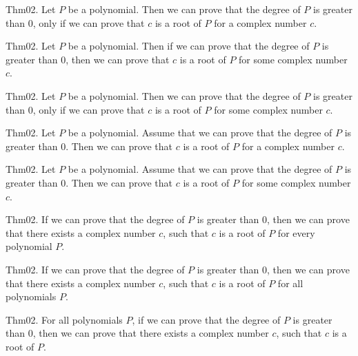 \documentclass{article}
\begin{document}
Thm02. Let $P$ be a polynomial. Then we can prove that the degree of $P$ is greater than $0$, only if we can prove that $c$ is a root of $P$ for a complex number $c$.

Thm02. Let $P$ be a polynomial. Then if we can prove that the degree of $P$ is greater than $0$, then we can prove that $c$ is a root of $P$ for some complex number $c$.

Thm02. Let $P$ be a polynomial. Then we can prove that the degree of $P$ is greater than $0$, only if we can prove that $c$ is a root of $P$ for some complex number $c$.

Thm02. Let $P$ be a polynomial. Assume that we can prove that the degree of $P$ is greater than $0$. Then we can prove that $c$ is a root of $P$ for a complex number $c$.

Thm02. Let $P$ be a polynomial. Assume that we can prove that the degree of $P$ is greater than $0$. Then we can prove that $c$ is a root of $P$ for some complex number $c$.

Thm02. If we can prove that the degree of $P$ is greater than $0$, then we can prove that there exists a complex number $c$, such that $c$ is a root of $P$ for every polynomial $P$.

Thm02. If we can prove that the degree of $P$ is greater than $0$, then we can prove that there exists a complex number $c$, such that $c$ is a root of $P$ for all polynomials $P$.

Thm02. For all polynomials $P$, if we can prove that the degree of $P$ is greater than $0$, then we can prove that there exists a complex number $c$, such that $c$ is a root of $P$.
\end{document}
